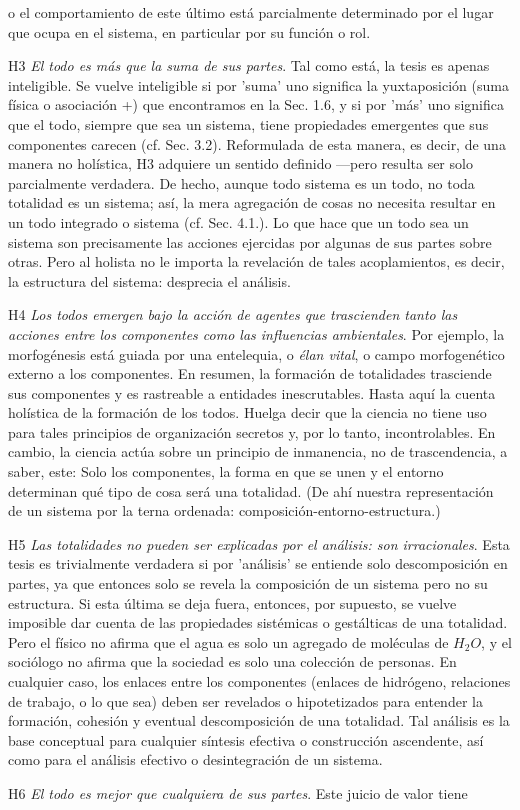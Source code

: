 {\fontsize{13}{15}\selectfont
o el comportamiento de este último está parcialmente determinado por el lugar que ocupa en el sistema, en particular por su función o rol.

H3 \textit{El todo es más que la suma de sus partes}. Tal como está, la tesis es apenas inteligible. Se vuelve inteligible si por 'suma' uno significa la yuxtaposición (suma física o asociación +) que encontramos en la Sec. 1.6, y si por 'más' uno significa que el todo, siempre que sea un sistema, 
tiene propiedades emergentes que sus componentes carecen (cf. Sec. 3.2). Reformulada de esta manera, es decir, de una manera no holística, H3 adquiere un sentido definido —pero resulta ser solo parcialmente verdadera. De hecho, aunque todo sistema es un todo, no toda totalidad es un sistema; así, 
la mera agregación de cosas no necesita resultar en un todo integrado o sistema (cf. Sec. 4.1.). Lo que hace que un todo sea un sistema son precisamente las acciones ejercidas por algunas de sus partes sobre otras. Pero al holista no le importa la revelación de tales acoplamientos, es decir, la estructura del sistema: desprecia el análisis.

H4 \textit{Los todos emergen bajo la acción de agentes que trascienden tanto las acciones entre los componentes como las influencias ambientales}. 
Por ejemplo, la morfogénesis está guiada por una entelequia, o \textit{élan vital}, o campo morfogenético externo a los componentes. 
En resumen, la formación de totalidades trasciende sus componentes y es rastreable a entidades inescrutables. Hasta aquí la cuenta holística de la formación de los todos. Huelga decir que la ciencia no tiene uso para tales principios de organización secretos y, por lo tanto, incontrolables. 
En cambio, la ciencia actúa sobre un principio de inmanencia, no de trascendencia, a saber, este: Solo los componentes, la forma en que se unen y el entorno determinan qué tipo de cosa será una totalidad. (De ahí nuestra representación de un sistema por la terna ordenada: composición-entorno-estructura.)

H5 \textit{Las totalidades no pueden ser explicadas por el análisis: son irracionales}. Esta tesis es trivialmente verdadera si por 'análisis' se entiende solo descomposición en partes, ya que entonces solo se revela la composición de un sistema pero no su estructura. 
Si esta última se deja fuera, entonces, por supuesto, se vuelve imposible dar cuenta de las propiedades sistémicas o gestálticas de una totalidad. Pero el físico no afirma que el agua es solo un agregado de moléculas de \( H_2O \), y el sociólogo no afirma que la sociedad es solo una colección de personas. 
En cualquier caso, los enlaces entre los componentes (enlaces de hidrógeno, relaciones de trabajo, o lo que sea) deben ser revelados o hipotetizados para entender la formación, cohesión y eventual descomposición de una totalidad. Tal análisis es la base conceptual para cualquier síntesis efectiva o construcción ascendente, así como para el análisis efectivo o desintegración de un sistema.

H6 \textit{El todo es mejor que cualquiera de sus partes}. Este juicio de valor tiene
}